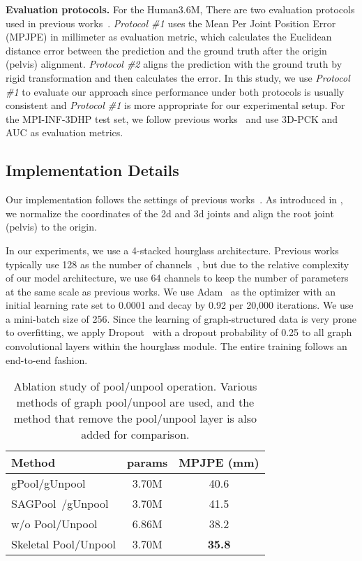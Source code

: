 \documentclass[final]{cvpr}
\begin{document}
\textbf{Evaluation protocols.}
For the Human3.6M, There are two evaluation protocols used in previous works~\cite{Martinez2017ASY,zhaoCVPR19semantic,Liu2020,wang2019gcn}.
\textit{Protocol \#1} uses the Mean Per Joint Position Error (MPJPE) in millimeter as evaluation metric, which calculates the Euclidean distance error between the prediction and the ground truth after the origin (pelvis) alignment.
\textit{Protocol \#2} aligns the prediction with the ground truth by rigid transformation and then calculates the error.
In this study, we use \textit{Protocol \#1} to evaluate our approach since performance under both protocols is usually consistent and \textit{Protocol \#1} is more appropriate for our experimental setup.
For the MPI-INF-3DHP test set, we follow previous works~\cite{luo2018orinet, wang2019gcn} and use 3D-PCK and AUC as evaluation metrics.

\subsection{Implementation Details}
Our implementation follows the settings of previous works~\cite{Martinez2017ASY,zhaoCVPR19semantic,Liu2020}.
As introduced in \cite{pavllo:videopose3d:2019}, we normalize the coordinates of the 2d and 3d joints and align the root joint (pelvis) to the origin.

In our experiments, we use a 4-stacked hourglass architecture. Previous works typically use 128 as the number of channels~\cite{zhaoCVPR19semantic, wang2019gcn, Liu2020}, 
but due to the relative complexity of our model architecture, we use 64 channels to keep the number of parameters at the same scale as previous works.
We use Adam~\cite{kingma:adam} as the optimizer with an initial learning rate set to 0.0001 and decay by 0.92 per 20,000 iterations. We use a mini-batch size of 256.
Since the learning of graph-structured data is very prone to overfitting, we apply Dropout~\cite{JMLR:v15:srivastava14a} with a dropout probability of 0.25 to all graph convolutional layers within the hourglass module.
The entire training follows an end-to-end fashion.


\begin{table}
\begin{center}
\begin{tabular}{l|c|c}
\hline
Method & params & MPJPE (mm)\\
\hline\hline
gPool/gUnpool~\cite{gao2019graph} & 3.70M & 40.6 \\
SAGPool~\cite{Lee2019SelfAttentionGP}/gUnpool~\cite{gao2019graph} & 3.70M & 41.5 \\
w/o Pool/Unpool & 6.86M & 38.2 \\
\hline
Skeletal Pool/Unpool & 3.70M & \textbf{35.8}\\
\hline
\end{tabular}
\end{center}
\caption{Ablation study of pool/unpool operation. Various methods of graph pool/unpool are used, and the method that remove the pool/unpool layer is also added for comparison.}
\label{tbl:ablation_pool}
\end{table}
\end{document}
